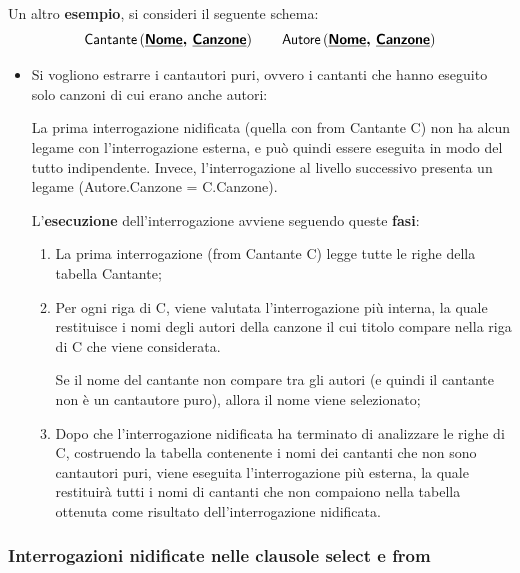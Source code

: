 \documentclass[a4paper]{article}
\begin{document}
	\noindent
	Un altro \textcolor{Green4}{\textbf{esempio}}, si consideri il seguente schema:
	\begin{equation*}
		\textsf{Cantante}\left(\textbf{\textsf{\underline{Nome}}, \textsf{\underline{Canzone}}}\right) \hspace{2em} \textsf{Autore}\left(\textbf{\textsf{\underline{Nome}}, \textsf{\underline{Canzone}}}\right)
	\end{equation*}
	\begin{itemize}
		\item Si vogliono estrarre i cantautori puri, ovvero i cantanti che hanno eseguito solo canzoni di cui erano anche autori:
		
		La prima interrogazione nidificata (quella con \textsf{from Cantante C}) non ha alcun legame con l'interrogazione esterna, e può quindi essere eseguita in modo del tutto indipendente. Invece, l'interrogazione al livello successivo presenta un legame (\textsf{Autore.Canzone = C.Canzone}).
		
		L'\textbf{esecuzione} dell'interrogazione avviene seguendo queste \textbf{fasi}:
		\begin{enumerate}
			\item La prima interrogazione (\textsf{from Cantante C}) legge tutte le righe della tabella \textsf{Cantante};
			
			
			\item Per ogni riga di \textsf{C}, viene valutata l'interrogazione più interna, la quale restituisce i nomi degli autori della canzone il cui titolo compare nella riga di \textsf{C} che viene considerata.
			
			Se il nome del cantante non compare tra gli autori (e quindi il cantante non è un cantautore puro), allora il nome viene selezionato;
			
			
			\item Dopo che l'interrogazione nidificata ha terminato di analizzare le righe di \textsf{C}, costruendo la tabella contenente i nomi dei cantanti che non sono cantautori puri, viene eseguita l'interrogazione più esterna, la quale restituirà tutti i nomi di cantanti che non compaiono nella tabella ottenuta come risultato dell'interrogazione nidificata.
		\end{enumerate}
	\end{itemize}\newpage
	
	\subsubsection{Interrogazioni nidificate nelle clausole \textsf{select} e \textsf{from}}\label{par: interrogazioni nidificate nelle clausole select e from}
	
\end{document}
